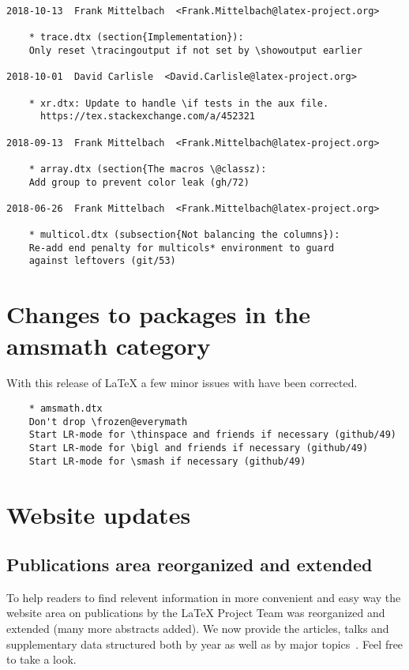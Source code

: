 \documentclass{ltnews}
\begin{document}
\begin{verbatim}
2018-10-13  Frank Mittelbach  <Frank.Mittelbach@latex-project.org>

	* trace.dtx (section{Implementation}):
	Only reset \tracingoutput if not set by \showoutput earlier

2018-10-01  David Carlisle  <David.Carlisle@latex-project.org>

	* xr.dtx: Update to handle \if tests in the aux file.
	  https://tex.stackexchange.com/a/452321

2018-09-13  Frank Mittelbach  <Frank.Mittelbach@latex-project.org>

	* array.dtx (section{The macros \@classz):
	Add group to prevent color leak (gh/72)

2018-06-26  Frank Mittelbach  <Frank.Mittelbach@latex-project.org>

	* multicol.dtx (subsection{Not balancing the columns}):
	Re-add end penalty for multicols* environment to guard
	against leftovers (git/53)
\end{verbatim}

\section{Changes to packages in the amsmath category}

\begin{em}
With this release of \LaTeX{} a few minor issues with 
have been corrected.
\end{em}

\begin{verbatim}
	* amsmath.dtx
	Don't drop \frozen@everymath
	Start LR-mode for \thinspace and friends if necessary (github/49)
	Start LR-mode for \bigl and friends if necessary (github/49)
	Start LR-mode for \smash if necessary (github/49)
\end{verbatim}

\section{Website updates}

\subsection{Publications area reorganized and extended}

To help readers to find relevent information in more convenient and
easy way the website area on publications by the \LaTeX{} Project Team
was reorganized and extended (many more abstracts added). We now
provide the articles, talks and supplementary data structured both by
year as well as by major topics~\cite{site-pub}. Feel free to take a
look.
\end{document}
